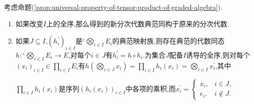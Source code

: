 \begin{remark}{}{}
	考虑命题(\ref{prop:universal-property-of-tensor-product-of-graded-algebra}).
	\begin{enumerate}
		\item 如果改变$I$上的全序,那么得到的新分次代数典范同构于原来的分次代数.
		\item 如果$J\subseteq I$,$\left(h_{i}^{\prime}\right)_{i\in I}$是${}^{\varepsilon}\bigotimes\limits_{i\in I}E_{i}$的典范映射族,则存在典范的代数同态$h:{}^{\varepsilon}\bigotimes\limits_{i\in I}E_{i}\to E$,对每个$i\in J$有$h_{i}^{\prime}=h\circ h_{i}$.为集合$J$配备$I$诱导的全序,则对每个$\left(x_{i}\right)_{i\in I}\in\prod\limits_{i\in I}E_{i}$有$h\left(\bigotimes\limits_{i\in J}x_{i}\right)=\prod\limits_{i\in I}h_{i}\left(x_{i}\right)=\bigotimes\limits_{i\in I}x_{i}^{\prime}$,其中
		\begin{center}
			$\prod\limits_{i\in I}h_{i}\left(x_{i}\right)$是序列$\left(h_{i}\left(x_{i}\right)\right)_{i\in I}$中各项的乘积,而$x_{i}^{\prime}=
			\begin{cases}
				x_{i},&i\in J,\\
				e_{i},&i\notin J.
			\end{cases}$
		\end{center}
	\end{enumerate}
\end{remark}

